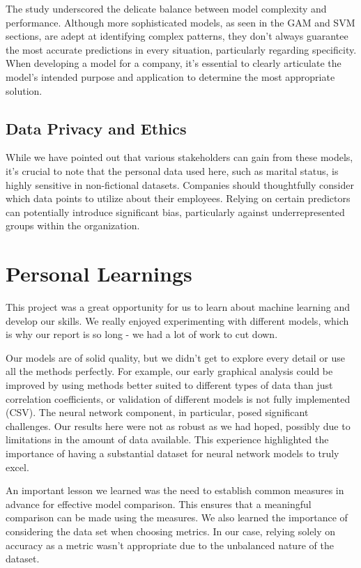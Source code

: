 \documentclass[
]{article}
\begin{document}
The study underscored the delicate balance between model complexity and
performance. Although more sophisticated models, as seen in the GAM and
SVM sections, are adept at identifying complex patterns, they don't
always guarantee the most accurate predictions in every situation,
particularly regarding specificity. When developing a model for a
company, it's essential to clearly articulate the model's intended
purpose and application to determine the most appropriate solution.

\subsection{Data Privacy and Ethics}\label{data-privacy-and-ethics}

While we have pointed out that various stakeholders can gain from these
models, it's crucial to note that the personal data used here, such as
marital status, is highly sensitive in non-fictional datasets. Companies
should thoughtfully consider which data points to utilize about their
employees. Relying on certain predictors can potentially introduce
significant bias, particularly against underrepresented groups within
the organization.

\section{Personal Learnings}\label{personal-learnings}

This project was a great opportunity for us to learn about machine
learning and develop our skills. We really enjoyed experimenting with
different models, which is why our report is so long - we had a lot of
work to cut down.

Our models are of solid quality, but we didn't get to explore every
detail or use all the methods perfectly. For example, our early
graphical analysis could be improved by using methods better suited to
different types of data than just correlation coefficients, or
validation of different models is not fully implemented (CSV). The
neural network component, in particular, posed significant challenges.
Our results here were not as robust as we had hoped, possibly due to
limitations in the amount of data available. This experience highlighted
the importance of having a substantial dataset for neural network models
to truly excel.

An important lesson we learned was the need to establish common measures
in advance for effective model comparison. This ensures that a
meaningful comparison can be made using the measures. We also learned
the importance of considering the data set when choosing metrics. In our
case, relying solely on accuracy as a metric wasn't appropriate due to
the unbalanced nature of the dataset.
\end{document}
